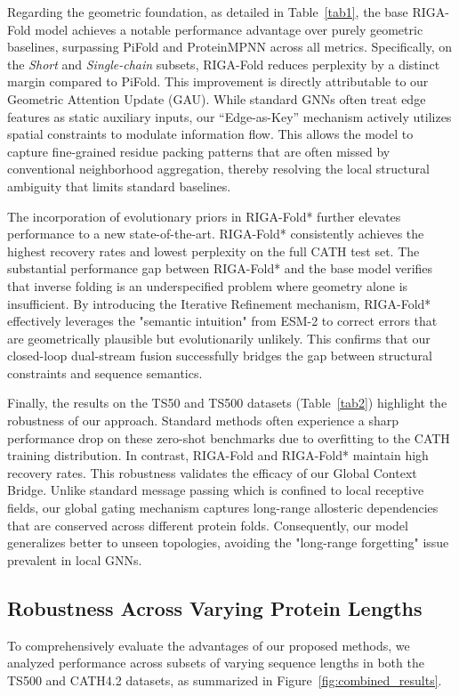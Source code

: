 \documentclass{article}
\theoremstyle{plain}
\theoremstyle{definition}
\theoremstyle{remark}
\begin{document}
{Regarding the geometric foundation, as detailed in Table~\ref{tab1}, the base RIGA-Fold model achieves a notable performance advantage over purely geometric baselines, surpassing PiFold and ProteinMPNN across all metrics. Specifically, on the \textit{Short} and \textit{Single-chain} subsets, RIGA-Fold reduces perplexity by a distinct margin compared to PiFold. This improvement is directly attributable to our Geometric Attention Update (GAU). While standard GNNs often treat edge features as static auxiliary inputs, our ``Edge-as-Key'' mechanism actively utilizes spatial constraints to modulate information flow. This allows the model to capture fine-grained residue packing patterns that are often missed by conventional neighborhood aggregation, thereby resolving the local structural ambiguity that limits standard baselines.

The incorporation of evolutionary priors in RIGA-Fold* further elevates performance to a new state-of-the-art. RIGA-Fold* consistently achieves the highest recovery rates and lowest perplexity on the full CATH test set. The substantial performance gap between RIGA-Fold* and the base model verifies that inverse folding is an underspecified problem where geometry alone is insufficient. By introducing the Iterative Refinement mechanism, RIGA-Fold* effectively leverages the "semantic intuition" from ESM-2 to correct errors that are geometrically plausible but evolutionarily unlikely. This confirms that our closed-loop dual-stream fusion successfully bridges the gap between structural constraints and sequence semantics.

Finally, the results on the TS50 and TS500 datasets (Table~\ref{tab2}) highlight the robustness of our approach. Standard methods often experience a sharp performance drop on these zero-shot benchmarks due to overfitting to the CATH training distribution. In contrast, RIGA-Fold and RIGA-Fold* maintain high recovery rates. This robustness validates the efficacy of our Global Context Bridge. Unlike standard message passing which is confined to local receptive fields, our global gating mechanism captures long-range allosteric dependencies that are conserved across different protein folds. Consequently, our model generalizes better to unseen topologies, avoiding the "long-range forgetting" issue prevalent in local GNNs.



\subsection{Robustness Across Varying Protein Lengths}
To comprehensively evaluate the advantages of our proposed methods, we analyzed performance across subsets of varying sequence lengths in both the TS500 and CATH4.2 datasets, as summarized in Figure~\ref{fig:combined_results}.

}
\end{document}
